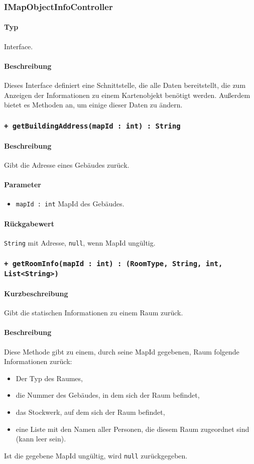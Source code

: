 \subsubsection{IMapObjectInfoController}
\paragraph*{Typ}
Interface.
\paragraph*{Beschreibung}
Dieses Interface definiert eine Schnittstelle, die alle Daten bereitstellt, 
die zum Anzeigen der Informationen zu einem Kartenobjekt benötigt werden. 
Außerdem bietet es Methoden an, um einige dieser Daten zu ändern.

\subsubsection*{\texttt{+ getBuildingAddress(mapId : int) : String}}%
\paragraph*{Beschreibung}
Gibt die Adresse eines Gebäudes zurück.
\paragraph*{Parameter}
\begin{itemize}
    \item \texttt{mapId : int} MapId des Gebäudes.
\end{itemize}
\paragraph*{Rückgabewert}
\texttt{String} mit Adresse, \texttt{null}, wenn MapId ungültig.

\subsubsection*{\texttt{+ getRoomInfo(mapId : int) : (RoomType, String, int, List<String>)}}%
\paragraph*{Kurzbeschreibung}
Gibt die statischen Informationen zu einem Raum zurück.
\paragraph*{Beschreibung}
Diese Methode gibt zu einem, durch seine MapId gegebenen, Raum folgende Informationen zurück:
\begin{itemize}
    \item Der Typ des Raumes,
    \item die Nummer des Gebäudes, in dem sich der Raum befindet,
    \item das Stockwerk, auf dem sich der Raum befindet,
    \item eine Liste mit den Namen aller Personen, die diesem Raum zugeordnet sind (kann leer sein).
\end{itemize}
Ist die gegebene MapId ungültig, wird \texttt{null} zurückgegeben.
